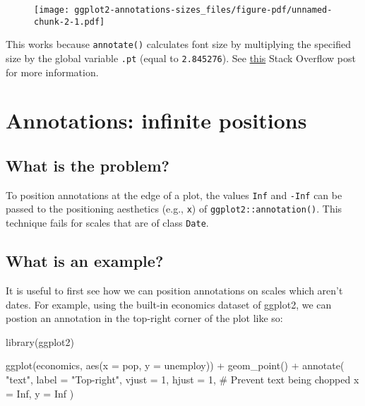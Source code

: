 \documentclass[
  letterpaper,
  DIV=11,
  numbers=noendperiod]{scrreprt}
\newenvironment{Shaded}{\begin{snugshade}}{\end{snugshade}}
\newcommand{\AttributeTok}[1]{\textcolor[rgb]{0.40,0.45,0.13}{#1}}
\newcommand{\CommentTok}[1]{\textcolor[rgb]{0.37,0.37,0.37}{#1}}
\newcommand{\ConstantTok}[1]{\textcolor[rgb]{0.56,0.35,0.01}{#1}}
\newcommand{\DecValTok}[1]{\textcolor[rgb]{0.68,0.00,0.00}{#1}}
\newcommand{\FunctionTok}[1]{\textcolor[rgb]{0.28,0.35,0.67}{#1}}
\newcommand{\NormalTok}[1]{\textcolor[rgb]{0.00,0.23,0.31}{#1}}
\newcommand{\SpecialCharTok}[1]{\textcolor[rgb]{0.37,0.37,0.37}{#1}}
\newcommand{\StringTok}[1]{\textcolor[rgb]{0.13,0.47,0.30}{#1}}
\begin{document}
\begin{figure}[H]

{\centering \texttt{[image: ggplot2-annotations-sizes\_files/figure-pdf/unnamed-chunk-2-1.pdf]}

}

\end{figure}

This works because \texttt{annotate()} calculates font size by
multiplying the specified size by the global variable \texttt{.pt}
(equal to \texttt{2.845276}). See
\href{https://stackoverflow.com/questions/65076492/ggplot-size-of-annotate-vs-size-of-element-text}{this}
Stack Overflow post for more information.

\hypertarget{annotations-infinite-positions}{%
\chapter{Annotations: infinite
positions}\label{annotations-infinite-positions}}

\hypertarget{what-is-the-problem-1}{%
\section{What is the problem?}\label{what-is-the-problem-1}}

To position annotations at the edge of a plot, the values \texttt{Inf}
and \texttt{-Inf} can be passed to the positioning aesthetics (e.g.,
\texttt{x}) of \texttt{ggplot2::annotation()}. This technique fails for
scales that are of class \texttt{Date}.

\hypertarget{what-is-an-example-1}{%
\section{What is an example?}\label{what-is-an-example-1}}

It is useful to first see how we can position annotations on scales
which aren't dates. For example, using the built-in economics dataset of
ggplot2, we can postion an annotation in the top-right corner of the
plot like so:

\begin{Shaded}
\begin{Highlighting}[]
\FunctionTok{library}\NormalTok{(ggplot2)}

\FunctionTok{ggplot}\NormalTok{(economics, }\FunctionTok{aes}\NormalTok{(}\AttributeTok{x =}\NormalTok{ pop, }\AttributeTok{y =}\NormalTok{ unemploy)) }\SpecialCharTok{+}
  \FunctionTok{geom\_point}\NormalTok{() }\SpecialCharTok{+}
  \FunctionTok{annotate}\NormalTok{(}
    \StringTok{"text"}\NormalTok{,}
    \AttributeTok{label =} \StringTok{"Top{-}right"}\NormalTok{,}
    \AttributeTok{vjust =} \DecValTok{1}\NormalTok{, }\AttributeTok{hjust =} \DecValTok{1}\NormalTok{, }\CommentTok{\# Prevent text being chopped}
    \AttributeTok{x =} \ConstantTok{Inf}\NormalTok{, }\AttributeTok{y =} \ConstantTok{Inf}
\NormalTok{  )}
\end{Highlighting}
\end{Shaded}
\end{document}
